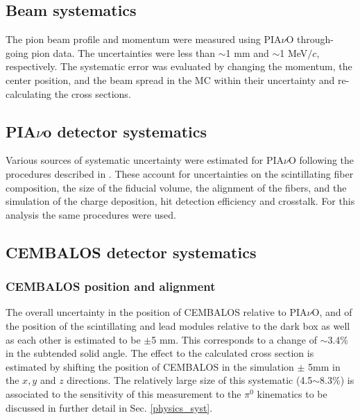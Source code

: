\subsection{Beam systematics}
The pion beam profile and momentum were measured using PIA$\nu$O through-going pion data. The uncertainties were less than $\sim$1 mm and $\sim$1 MeV$/c$, respectively. The systematic error was evaluated by changing the momentum, the center position, and the beam spread in the MC within their uncertainty and re-calculating the cross sections.
\subsection{PIA$\nu$o detector systematics}
Various sources of systematic uncertainty were estimated for PIA$\nu$O following the procedures described in \cite{duet}. These account for uncertainties on the scintillating fiber composition, the size of the fiducial volume, the alignment of the fibers, and the simulation of the charge deposition, hit detection efficiency and crosstalk. For this analysis the same procedures were used.
\subsection{CEMBALOS detector systematics}\label{sec:cembalos_syst}
\subsubsection{\bf CEMBALOS position and alignment}
The overall uncertainty in the position of CEMBALOS relative to PIA$\nu$O, and of the position of the scintillating and lead modules relative to the dark box as well as each other is estimated to be $\pm$5 mm. This corresponds to a change of $\sim$3.4\% in the subtended solid angle. The effect to the calculated cross section is estimated by shifting the position of CEMBALOS in the simulation $\pm$ 5mm in the $x,y$ and $z$ directions. The relatively large size of this systematic (4.5$\sim$8.3\%) is associated to the sensitivity of this measurement to the $\pi^0$ kinematics to be discussed in further detail in Sec. \ref{physics_syst}.
